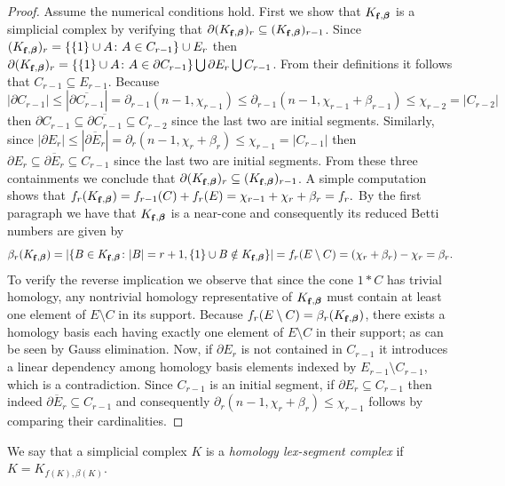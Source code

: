 \documentclass[11pt]{article}
\numberwithin{claimcounter}{theorem}
\theoremstyle{remark}
\theoremstyle{definition}
\numberwithin{theorem}{section}
\DeclareMathOperator{\fvec}{\bf f}
\newcommand{\bbeta}{\boldsymbol{\beta}}
\begin{document}
\begin{proof}
Assume the numerical conditions hold.
  First we show that $K_{\fvec,\bbeta}$ is a simplicial complex by verifying that $\partial (K_{\fvec,\bbeta})_r \subseteq (K_{\fvec,\bbeta})_{r-1}$.
  Since $(K_{\fvec,\bbeta})_r = \{ \{1\} \cup A \colon A\in C_{r-1}\}\cup E_r$ then
  $\partial (K_{\fvec,\bbeta})_r = \{\{1\} \cup A \colon A\in \partial C_{r-1}\} \bigcup \partial E_r \bigcup C_{r-1}$.
  From their definitions it follows that $C_{r-1}\subseteq E_{r-1}$. 
  Because $$|\partial C_{r-1}|\leq |\overline{\partial C_{r-1}}| = \partial_{r-1}(n-1,\chi_{r-1}) \leq \partial_{r-1}(n-1,\chi_{r-1}+\beta_{r-1})\leq \chi_{r-2} = |C_{r-2}|$$ 
  then $\partial C_{r-1}\subseteq \overline{\partial C_{r-1}}\subseteq C_{r-2}$ since the last two are initial segments.
  Similarly, since $|\partial E_r|\leq |\overline{\partial E_r}|=\partial_r(n-1,\chi_r+\beta_r) \leq \chi_{r-1}= |C_{r-1}|$ 
  then $\partial E_r \subseteq \overline{\partial E_r}\subseteq C_{r-1}$ since the last two are initial segments. From these three containments we conclude that $\partial (K_{\fvec,\bbeta})_r \subseteq (K_{\fvec,\bbeta})_{r-1}$.
%
    A simple computation shows that $f_r(K_{\fvec,\bbeta})=f_{r-1}(C)+f_r(E)=\chi_{r-1}+\chi_r+\beta_r=f_r.$    
    By the first paragraph we have that $K_{\fvec,\bbeta}$ is a near-cone and consequently its reduced Betti numbers are given by~\cite[Theorem 4.3]{Bjorner-Kalai-ACTA}
    \[
    \beta_r(K_{\fvec,\bbeta}) =|\{B\in K_{\fvec,\bbeta}\colon |B|=r+1, \{1\} \cup B \notin K_{\fvec,\bbeta}\}| = 
    f_r(E\setminus C) = 
    (\chi_r+\beta_r)-\chi_r=\beta_r.
    \]
%
    To verify the reverse implication we observe that since the cone $1*C$ has trivial homology, any nontrivial homology representative of $K_{\fvec,\bbeta}$ must contain at least one element of $E\setminus C$ in its support.
    Because $f_r(E\setminus C)=\beta_r(K_{\fvec,\bbeta})$, there exists a homology basis each having exactly one element of $E\setminus C$ in their support; as can be seen by Gauss elimination.
    Now, if $\partial E_r$ is not contained in $C_{r-1}$ it introduces a linear dependency among homology basis elements indexed by $E_{r-1}\setminus C_{r-1}$, which is a contradiction. Since $C_{r-1}$ is an initial segment, if $\partial E_r \subseteq C_{r-1}$ then indeed $\overline{\partial E_r} \subseteq C_{r-1}$ and consequently $\partial_r(n-1,\chi_r+\beta_r)\leq \chi_{r-1}$ follows by comparing their cardinalities.
\end{proof}
We say that a simplicial complex $K$ is a \emph{homology lex-segment complex} if $K=K_{f(K),\beta(K)}$.
\end{document}

